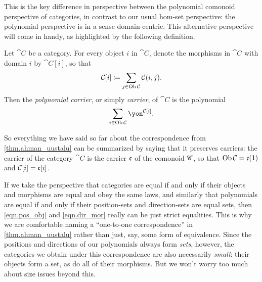 \documentclass[Book-Poly]{subfiles}
\begin{document}
This is the key difference in perspective between the polynomial comonoid perspective of categories, in contrast to our usual hom-set perspective: the polynomial perspective is in a sense domain-centric.
This alternative perspective will come in handy, as highlighted by the following definition.

\begin{definition}
Let $\cat{C}$ be a category.
For every object $i$ in $\cat{C}$, denote the morphisms in $\cat{C}$ with domain $i$ by $\cat{C}[i]$, so that
\[
    \mathcal{C}[i]\coloneqq\sum_{j\in\operatorname{Ob}\mathcal{C}}\mathcal{C}(i,j).
\]
Then the \emph{polynomial carrier}, or simply \emph{carrier}, of $\cat{C}$ is the polynomial
\[
    \sum_{i\in\Ob\cat{C}}\yon^{\cat{C}[i]}.
\]
\end{definition}

So everything we have said so far about the correspondence from \cref{thm.ahman_uustalu} can be summarized by saying that it preserves carriers: the carrier of the category $\cat{C}$ is the carrier $\mathfrak{c}$ of the comonoid $\mathscr{C}$, so that $\operatorname{Ob}\mathcal{C}=\mathfrak{c}(\textsf{1})$ and $\mathcal{C}[i]=\mathfrak{c}[i]$.

\begin{remark}
If we take the perspective that categories are equal if and only if their objects and morphisms are equal and obey the same laws, and similarly that polynomials are equal if and only if their position-sets and direction-sets are equal sets, then \eqref{eqn.pos_obj} and \eqref{eqn.dir_mor} really can be just strict equalities.
This is why we are comfortable naming a ``one-to-one correspondence'' in \cref{thm.ahman_uustalu} rather than just, say, some form of equivalence.
Since the positions and directions of our polynomials always form \emph{sets}, however, the categories we obtain under this correspondence are also necessarily \emph{small}: their objects form a set, as do all of their morphisms.
But we won't worry too much about size issues beyond this.
\end{remark}
\end{document}
